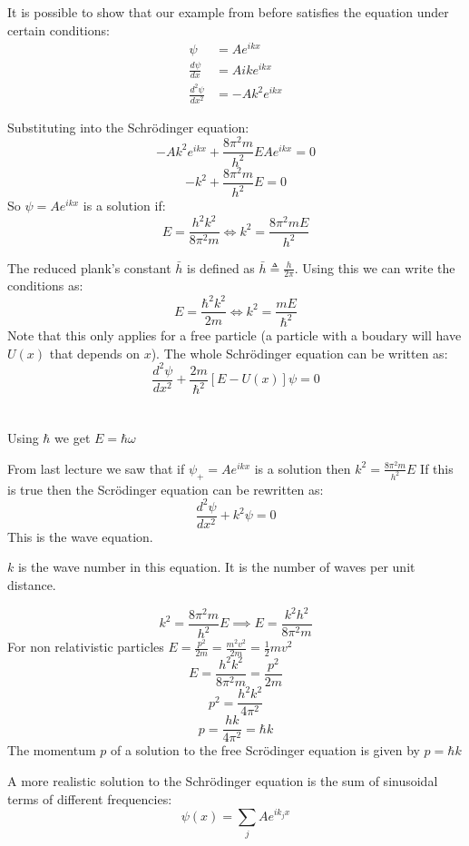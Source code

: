 \documentclass{article}
\newcommand{\dv}[3][]{\frac{d^{#1}{#2}}{d{#3}^{#1}}}
\newcommand{\hb}{\hbar}
\newcounter{example}[section]
\begin{document}
It is possible to show that our example from before satisfies the equation under certain conditions:
\begin{align*}
\psi&=Ae^{ikx}\\
\dv{\psi}{x}&=Aike^{ikx}\\
\dv[2]{\psi}{x}&=-Ak^2e^{ikx}
\end{align*}

Substituting into the Schr\"odinger equation:
\[-Ak^2e^{ikx}+\frac{8\pi^2m}{h^2}EAe^{ikx}=0\]
\[-k^2+\frac{8\pi^2m}{h^2}E=0\]
So \(\psi=Ae^{ikx}\) is a solution if:
\[E=\frac{h^2k^2}{8\pi^2m}\iff k^2=\frac{8\pi^2mE}{h^2}\]

The reduced plank's constant \(\bar h\) is defined as \(\bar h\triangleq\frac{h}{2\pi}\). Using this we can write the conditions as:
\[E=\frac{\hb^2k^2}{2m}\iff k^2=\frac{mE}{\hb^2}\]
Note that this only applies for a free particle (a particle with a boudary will have \(U(x)\) that depends on \(x\)). The whole Schr\"odinger equation can be written as:
\[\dv[2]{\psi}{x}+\frac{2m}{\hb^2}[E-U(x)]\psi=0\]


\section{}

Using \(\hb\) we get \(E=\hb\omega\)

From last lecture we saw that if \(\psi_+=Ae^{ikx}\) is a solution then \(k^2=\frac{8\pi^2m}{h^2}E\) If this is true then the Scr\"odinger equation can be rewritten as:
\[\dv[2]{\psi}{x}+k^2\psi=0\]
This is the wave equation.

\(k\) is the wave number in this equation. It is the number of waves per unit distance.

\[k^2=\frac{8\pi^2m}{h^2}E\implies E=\frac{k^2h^2}{8\pi^2m}\]
For non relativistic particles \(E=\frac{p^2}{2m}=\frac{m^2v^2}{2m}=\frac12mv^2\)
\[E=\frac{h^2k^2}{8\pi^2m}=\frac{p^2}{2m}\]
\[p^2=\frac{h^2k^2}{4\pi^2}\]
\[p=\frac{hk}{4\pi^2}=\hb k\]
The momentum \(p\) of a solution to the free Scr\"odinger equation is given by \(p=\hb k\)

A more realistic solution to the Schr\"odinger equation is the sum of sinusoidal terms of different frequencies:
\[\psi(x)=\sum_jAe^{ik_jx}\]
\end{document}
